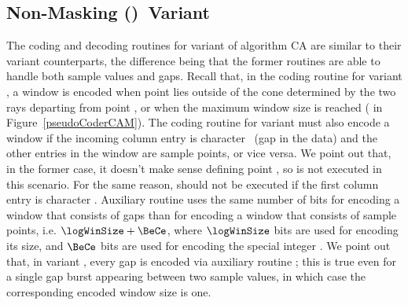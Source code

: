 \vspace{-5pt}




\vspace{-22pt}
\subsection{Non-Masking (\NOmaskalgo)\ Variant}
\label{algo:ca:nmvariant}


\vspace{-6pt}
The coding and decoding routines for variant \NOmaskalgo of algorithm CA are similar to their variant \maskalgo counterparts, the difference being that the former routines are able to handle both sample values and gaps. Recall that, in the coding routine for variant \maskalgo, a window is encoded when point \incoming lies outside of the cone determined by the two rays departing from point \archived, or when the maximum window size is reached ( in Figure~\ref{pseudoCoderCAM}). The coding routine for variant \NOmaskalgo must also encode a window if the incoming column entry is character \noData\ (gap in the data) and the other entries in the window are sample points, or vice versa. We point out that, in the former case, it doesn't make sense defining point \archived, so  is not executed in this scenario. For the same reason,  should not be executed if the first column entry is character \noData. Auxiliary routine \CAWinEnd uses the same number of bits for encoding a window that consists of gaps than for encoding a window that consists of sample points, i.e. $\logWinSize+\BeCe$, where $\logWinSize$ bits are used for encoding its size, and $\BeCe$ bits are used for encoding the special integer \nodata. We point out that, in variant \NOmaskalgo, every gap is encoded via auxiliary routine \CAWinEnd; this is true even for a single gap burst appearing between two sample values, in which case the corresponding encoded window size is one.

